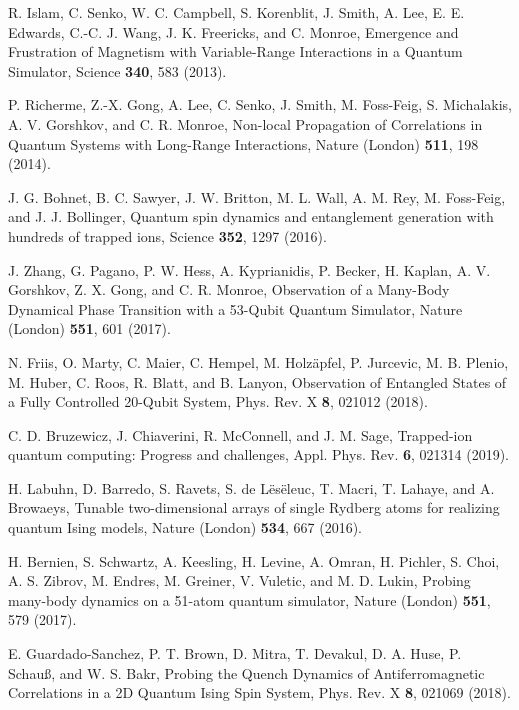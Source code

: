 \documentclass[pra,twocolumn,showpacs,preprintnumbers,amsmath,amssymb,superscriptaddress]{revtex4-1}
\begin{document}
\begin{thebibliography}{99}
 R. Islam, C. Senko, W. C. Campbell, S. Korenblit, J. Smith, A. Lee, E. E. Edwards, C.-C. J. Wang, J. K. Freericks, and C. Monroe, Emergence and Frustration of Magnetism with Variable-Range Interactions in a Quantum Simulator, Science {\bf 340}, 583 (2013).

 P. Richerme, Z.-X. Gong, A. Lee, C. Senko, J. Smith, M. Foss-Feig, S. Michalakis, A. V. Gorshkov, and C. R. Monroe, Non-local Propagation of Correlations in Quantum Systems with Long-Range Interactions, Nature (London) {\bf 511}, 198 (2014).

 J. G. Bohnet, B. C. Sawyer, J. W. Britton, M. L. Wall, A. M. Rey, M. Foss-Feig, and J. J. Bollinger, Quantum spin dynamics and entanglement generation with hundreds of trapped ions, Science {\bf 352}, 1297 (2016).

 J. Zhang, G. Pagano, P. W. Hess, A. Kyprianidis, P. Becker, H. Kaplan, A. V. Gorshkov, Z. X. Gong, and C. R. Monroe, Observation of a Many-Body Dynamical Phase Transition with a 53-Qubit Quantum Simulator, Nature (London) {\bf 551}, 601 (2017).

 N. Friis, O. Marty, C. Maier, C. Hempel, M. Holz\"apfel, P. Jurcevic, M. B. Plenio, M. Huber, C. Roos, R. Blatt, and B. Lanyon, 
Observation of Entangled States of a Fully Controlled 20-Qubit System, Phys. Rev. X {\bf 8}, 021012 (2018).

 C. D. Bruzewicz, J. Chiaverini, R. McConnell, and J. M. Sage, Trapped-ion quantum computing: Progress and challenges, Appl. Phys. Rev. {\bf 6}, 021314 (2019).



 H. Labuhn, D. Barredo, S. Ravets, S. de L\"es\"eleuc, T. Macri, T. Lahaye, and A. Browaeys, Tunable two-dimensional arrays of single Rydberg atoms for realizing quantum Ising models, Nature (London) {\bf 534}, 667 (2016).
	
 H. Bernien, S. Schwartz, A. Keesling, H. Levine, A. Omran, H. Pichler, S. Choi, A. S. Zibrov, M. Endres, M. Greiner, V. Vuletic, and M. D. Lukin, Probing many-body dynamics on a 51-atom quantum simulator, Nature (London) {\bf 551}, 579 (2017).
	
 E. Guardado-Sanchez, P. T. Brown, D. Mitra, T. Devakul, D. A. Huse, P. Schau\ss, and W. S. Bakr, Probing the Quench Dynamics of Antiferromagnetic Correlations in a 2D Quantum Ising Spin System,  Phys. Rev. X {\bf 8}, 021069 (2018).
	

\end{thebibliography}
\end{document}
